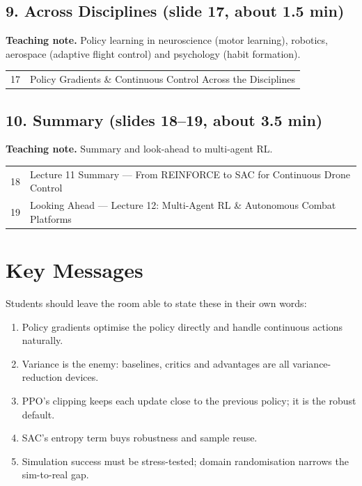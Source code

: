 \documentclass[11pt]{article}
\begin{document}
\subsection{9. Across Disciplines \normalfont\small\color{GreyN}(slide 17, about 1.5 min)}

\textbf{Teaching note.} Policy learning in neuroscience (motor learning), robotics, aerospace (adaptive flight control) and psychology (habit formation).

\begin{center}\small\renewcommand{\arraystretch}{1.1}\begin{tabularx}{\textwidth}{@{}r X@{}}17 & Policy Gradients \& Continuous Control Across the Disciplines\\\end{tabularx}\end{center}

\subsection{10. Summary \normalfont\small\color{GreyN}(slides 18--19, about 3.5 min)}

\textbf{Teaching note.} Summary and look-ahead to multi-agent RL.

\begin{center}\small\renewcommand{\arraystretch}{1.1}\begin{tabularx}{\textwidth}{@{}r X@{}}18 & Lecture 11 Summary --- From REINFORCE to SAC for Continuous Drone Control\\
19 & Looking Ahead --- Lecture 12: Multi-Agent RL \& Autonomous Combat Platforms\\\end{tabularx}\end{center}

\section{Key Messages}Students should leave the room able to state these in their own words:\begin{keypoint}\begin{enumerate}\item Policy gradients optimise the policy directly and handle continuous actions naturally.\item Variance is the enemy: baselines, critics and advantages are all variance-reduction devices.\item PPO's clipping keeps each update close to the previous policy; it is the robust default.\item SAC's entropy term buys robustness and sample reuse.\item Simulation success must be stress-tested; domain randomisation narrows the sim-to-real gap.\end{enumerate}\end{keypoint}
\end{document}
